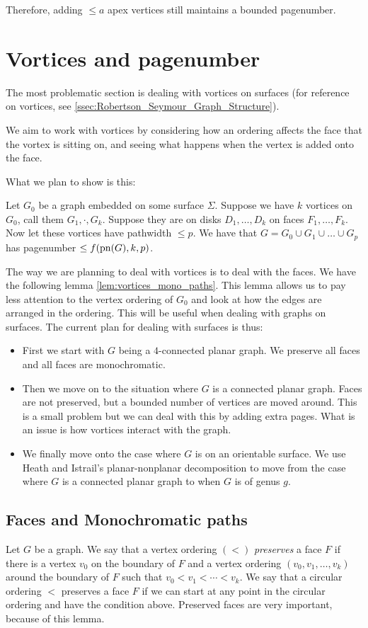 Therefore, adding \( \leq a\) apex vertices still maintains a bounded pagenumber.

\section{Vortices and pagenumber}
The most problematic section is dealing with vortices on surfaces (for reference on vortices, see \cref{ssec:Robertson_Seymour_Graph_Structure}).

We aim to work with vortices by considering how an ordering affects the face that the vortex is sitting on, and seeing what happens when the vertex is added onto the face.

What we plan to show is this:
\begin{conjecture}
	Let \(G_0\) be a graph embedded on some surface \(\Sigma\). Suppose we have \(k\) vortices on \(G_0\), call them \(G_1, \cdot , G_k\). Suppose they are on disks \(D_1, \ldots, D_k\) on faces \(F_1, \ldots, F_k\). Now let these vortices have pathwidth \(\leq p\).
	We have that \(G = G_0 \cup G_1 \cup \ldots \cup G_p\) has pagenumber \(\leq f(\operatorname{pn}(G), k, p)\).
\end{conjecture}
The way we are planning to deal with vortices is to deal with the faces. We have the following lemma \cref{lem:vortices_mono_paths}. This lemma allows us to pay less attention to the vertex ordering of \(G_0\) and look at how the edges are arranged in the ordering. This will be useful when dealing with graphs on surfaces.
The current plan for dealing with surfaces is thus:
\begin{itemize}
	\item First we start with \(G\) being a \(4\)-connected planar graph. We preserve all faces and all faces are monochromatic.
	\item Then we move on to the situation where \(G\) is a connected planar graph. Faces are not preserved, but a bounded number of vertices are moved around. This is a small problem but we can deal with this by adding extra pages. What is an issue is how vortices interact with the graph.
	\item We finally move onto the case where \(G\) is on an orientable surface. We use Heath and Istrail's \cite{heathPagenumberGenusGraphs1992} planar-nonplanar decomposition to move from the case where \(G\) is a connected planar graph to when \(G\) is of genus \(g\).
\end{itemize}

\subsection{Faces and Monochromatic paths}
Let \(G\) be a graph. We say that a vertex ordering \((<)\) \textit{preserves} a face \(F\) if there is a vertex \(v_0\) on the boundary of \(F\) and a vertex ordering \((v_0, v_1, \ldots, v_k)\) around the boundary of \(F\) such that \(v_0 < v_1 < \cdots < v_k\). We say that a circular ordering \(<\) preserves a face \(F\) if we can start at any point in the circular ordering and have the condition above.
Preserved faces are very important, because of this lemma.

